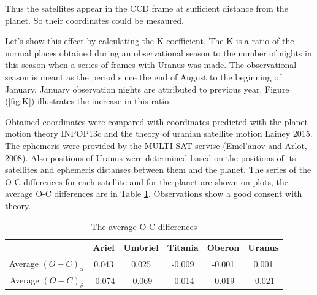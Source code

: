 \documentclass[]{article}
\begin{document}
 Thus the satellites appear in the CCD frame at sufficient distance from the planet. So their coordinates could be mesaured.\par
Let's show this effect by calculating the K coefficient. The K is a ratio of the normal places obtained during an observational season to the number of nights in this season when a series of frames with Uranus was made. The observational season is meant as the period since the end of August to the beginning of January. January observation nights are attributed to previous year. Figure (\ref{fig:K}) illustrates the increase in this ratio.\par


Obtained coordinates were compared with coordinates predicted with the planet motion theory INPOP13c and the theory of uranian satellite motion Lainey 2015. The ephemeris were provided by the MULTI-SAT servise (Emel'anov and Arlot, 2008). Also positions of Uranus were determined based on the positions of its satellites and ephemeris distanses between them and the planet.  The series of the O-C differences for each satellite and for the planet are shown on plots, the average O-C differences are in Table \ref{mean_OC}.
 Observations show a good consent with theory.\par
\begin{table}
\begin{center}
\caption{The average O-C differences}
\label{mean_OC}
\begin{tabular}{|c|c|c|c|c|c|}
\hline
& Ariel&Umbriel&Titania& Oberon & Uranus \\
\hline
Average $(O-C)_\alpha$ & 0.043 & 0.025 & -0.009 & -0.001 & 0.001\\
Average $(O-C)_\delta$ & -0.074 & -0.069 & -0.014 & -0.019 & -0.021\\
\hline
\end{tabular}
\end{center}
\end{table}

\newpage
\end{document}
